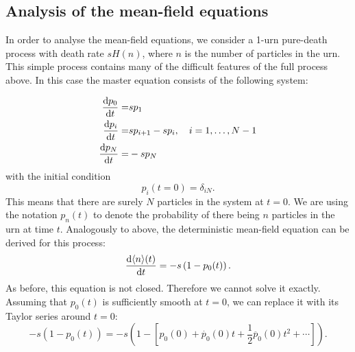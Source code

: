 \FloatBarrier
\subsection{Analysis of the mean-field equations}
In order to analyse the mean-field equations, we consider a 1-urn pure-death
process with death rate \(s H(n)\), where \(n\) is the number of particles in
the urn. This simple process contains many of the difficult features of the full
process above. In this case the master equation consists of the following system:

\begin{align*}
    \frac{\mathrm{d} p_0}{\mathrm{d} t} =& s p_1\\
    \frac{\mathrm{d} p_i}{\mathrm{d} t} =& s p_{i+1} - s p_i, \quad i = 1,\dotsc,N-1\\
    \frac{\mathrm{d} p_N}{\mathrm{d} t} =& - s p_N
\end{align*}
with the initial condition
\begin{equation}
    \label{eqn:pure_death_ic}
    p_i(t=0) = \delta_{iN}.
\end{equation}
This means that there are surely \(N\) particles in the system at \(t=0\). We
are using the notation \(p_n(t)\) to denote the probability of there being \(n\)
particles in the urn at time \(t\).  Analogously to above, the deterministic
mean-field equation can be derived for this process:
\begin{equation*}
    \frac{\mathrm{d} \langle n \rangle(t)}{\mathrm{d} t} = -s \left(1-p_0(t)\right).
\end{equation*}
As before, this equation is not closed. Therefore we cannot solve it exactly.
Assuming that \(p_0(t)\) is sufficiently smooth at \(t=0\), we can replace it
with its Taylor series around \(t=0\):
\begin{equation*}
    -s(1-p_0(t)) = -s\left(1 - \left[p_0(0) + \dot{p_0}(0)t +
    \frac{1}{2}\ddot{p_0}(0)t^2 + \dotsb \right] \right).
\end{equation*}

